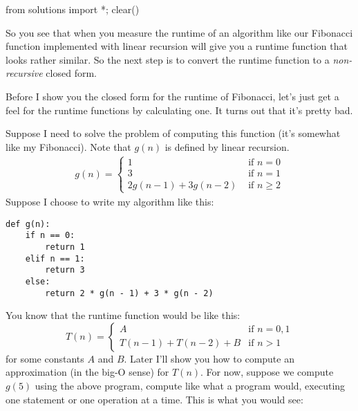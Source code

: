 \begin{python0}
from solutions import *; clear()
\end{python0}

So you see that when you measure the runtime of an algorithm
like our Fibonacci function implemented with linear recursion
will give you a runtime function that looks rather similar.
So the next step is to convert the runtime function
to a \textit{non-recursive} closed form.

Before I show you the closed form for the runtime of Fibonacci, let's just get a feel for the
runtime functions by calculating one.
It turns out that it's pretty bad.

Suppose I need to solve the problem of computing this
function (it's somewhat like my Fibonacci).
Note that $g(n)$ is defined by linear recursion.
\begin{align*}
g(n) = 
\begin{cases}
1                     & \text{ if $n = 0$} \\
3                     & \text{ if $n = 1$} \\
2g(n - 1) + 3g(n - 2) & \text{ if $n \geq 2$}
\end{cases}
\end{align*}
Suppose I choose to write my algorithm like this:
\begin{Verbatim}[frame=single,fontsize=\footnotesize]
def g(n):
    if n == 0: 
        return 1
    elif n == 1:
        return 3
    else:
        return 2 * g(n - 1) + 3 * g(n - 2)
\end{Verbatim}
You know that the runtime function would be like this:
\[
T(n) = 
\begin{cases}
A                     & \text{if $n = 0, 1$} \\
T(n-1) + T(n-2) + B & \text{if $n > 1$}
\end{cases}
\]
for some constants $A$ and $B$.
Later I'll show you how to compute an approximation (in the big-O sense)
for $T(n)$.
For now, suppose we compute $g(5)$ using the above 
program, compute like what a program would, executing one statement
or one operation at a time.
This is what you would see:

